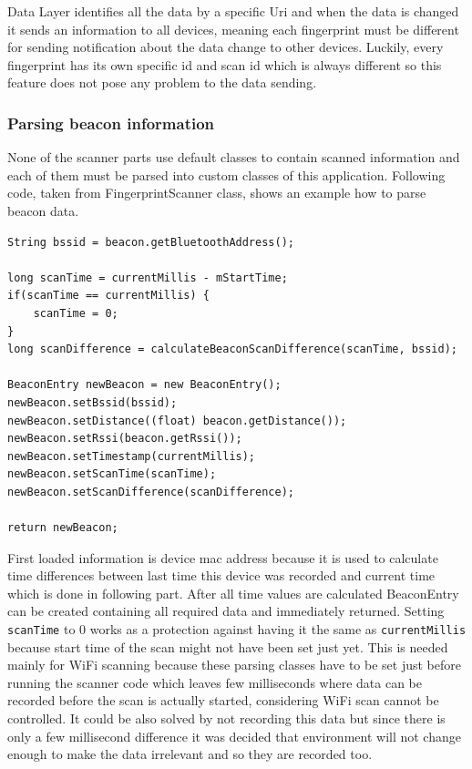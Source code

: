 Data Layer identifies all the data by a specific Uri and when the data is changed it sends an information to all devices, meaning each fingerprint must be different for sending notification about the data change to other devices. Luckily, every fingerprint has its own specific id and scan id which is always different so this feature does not pose any problem to the data sending.

\subsubsection{Parsing beacon information}\label{subsubsec:ParsingBeaconInformation}
None of the scanner parts use default classes to contain scanned information and each of them must be parsed into custom classes of this application. Following code, taken from FingerprintScanner class, shows an example how to parse beacon data.

\begin{lstlisting}[caption=Parsing beacon information]
String bssid = beacon.getBluetoothAddress();

long scanTime = currentMillis - mStartTime;
if(scanTime == currentMillis) {
	scanTime = 0;
}
long scanDifference = calculateBeaconScanDifference(scanTime, bssid);

BeaconEntry newBeacon = new BeaconEntry();
newBeacon.setBssid(bssid);
newBeacon.setDistance((float) beacon.getDistance());
newBeacon.setRssi(beacon.getRssi());
newBeacon.setTimestamp(currentMillis);
newBeacon.setScanTime(scanTime);
newBeacon.setScanDifference(scanDifference);

return newBeacon;
\end{lstlisting}

First loaded information is device mac address because it is used to calculate time differences between last time this device was recorded and current time which is done in following part. After all time values are calculated BeaconEntry can be created containing all required data and immediately returned. Setting \verb|scanTime| to 0 works as a protection against having it the same as \verb|currentMillis| because start time of the scan might not have been set just yet. This is needed mainly for WiFi scanning because these parsing classes have to be set just before running the scanner code which leaves few milliseconds where data can be recorded before the scan is actually started, considering WiFi scan cannot be controlled. It could be also solved by not recording this data but since there is only a few millisecond difference it was decided that environment will not change enough to make the data irrelevant and so they are recorded too.

